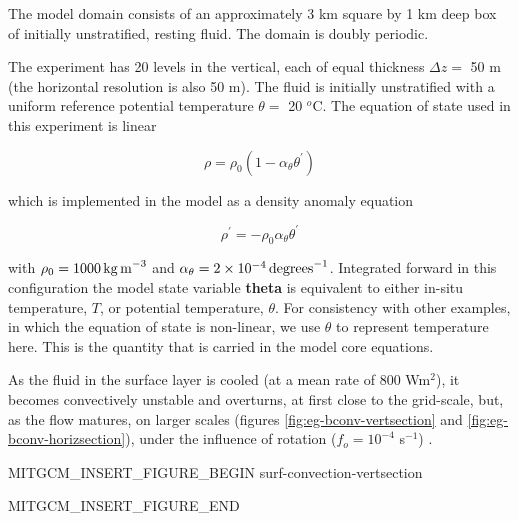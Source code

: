 The model domain consists of an approximately 3
km square by 1 km deep box of initially
unstratified, resting fluid. The domain is doubly periodic. 

The experiment has 20 levels in the vertical, each of equal thickness $\Delta z =$ 50
m (the horizontal resolution is also 50 m). The fluid is initially unstratified with a
uniform reference potential temperature $\theta = $ 20 $^o$C. The equation of state
used in this experiment is linear

\begin{equation}
\label{eq:eg-bconv-linear1_eos}
\rho = \rho_{0} ( 1 - \alpha_{\theta}\theta^{'} )
\end{equation}

\noindent which is implemented in the model as a density anomaly equation

\begin{equation}
\label{eq:eg-bconv-linear1_eos_pert}
\rho^{'} = -\rho_{0}\alpha_{\theta}\theta^{'}
\end{equation}

\noindent with $\rho_{0}=1000\,{\rm kg\,m}^{-3}$ and 
$\alpha_{\theta}=2\times10^{-4}\,{\rm degrees}^{-1} $. Integrated forward in
this configuration the model state variable {\bf theta} is equivalent to
either in-situ temperature, $T$, or potential temperature, $\theta$. For 
consistency with other examples, in which the equation of state is
non-linear, we use $\theta$ to represent temperature here. This is
the quantity that is carried in the model core equations.

As the fluid in the surface layer is cooled (at a mean rate of 800 Wm$^2$), it becomes 
convectively unstable and 
overturns, at first close to the grid-scale, but, as the flow matures, on larger scales 
(figures \ref{fig:eg-bconv-vertsection} and \ref{fig:eg-bconv-horizsection}), under the influence of 
rotation ($f_o = 10^{-4}$ s$^{-1}$) .

\begin{rawhtml}MITGCM_INSERT_FIGURE_BEGIN surf-convection-vertsection\end{rawhtml}
\begin{figure}
\begin{center}
\end{center}
\caption{
}
\label{fig:eg-bconv-vertsection}
\label{fig:surf-convection-vertsection}
\end{figure}
\begin{rawhtml}MITGCM_INSERT_FIGURE_END\end{rawhtml}

